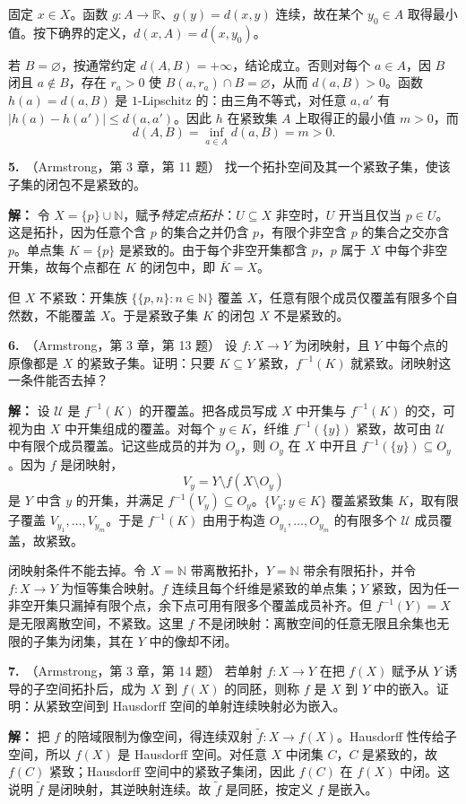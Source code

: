 \documentclass{article}
\newcommand{\R}{\mathbb R}
\newcommand{\problem}[2]{\par\medskip\noindent\textbf{#1.}\ （#2）\quad}
\begin{document}
固定 $x\in X$。函数 $g:A\to\R$、$g(y)=d(x,y)$ 连续，故在某个 $y_0\in A$ 取得最小值。按下确界的定义，$d(x,A)=d(x,y_0)$。

若 $B=\varnothing$，按通常约定 $d(A,B)=+\infty$，结论成立。否则对每个 $a\in A$，因 $B$ 闭且 $a\notin B$，存在 $r_a>0$ 使 $B(a,r_a)\cap B=\varnothing$，从而 $d(a,B)>0$。函数 $h(a)=d(a,B)$ 是 $1$-Lipschitz 的：由三角不等式，对任意 $a,a'$ 有 $|h(a)-h(a')|\le d(a,a')$。因此 $h$ 在紧致集 $A$ 上取得正的最小值 $m>0$，而
\[
d(A,B)=\inf_{a\in A}d(a,B)=m>0.
\]

\problem{5}{Armstrong，第 3 章，第 11 题}
找一个拓扑空间及其一个紧致子集，使该子集的闭包不是紧致的。
\par\noindent\textbf{解：}
令 $X=\{p\}\cup\mathbb N$，赋予\emph{特定点拓扑}：$U\subseteq X$ 非空时，$U$ 开当且仅当 $p\in U$。这是拓扑，因为任意个含 $p$ 的集合之并仍含 $p$，有限个非空含 $p$ 的集合之交亦含 $p$。单点集 $K=\{p\}$ 是紧致的。由于每个非空开集都含 $p$，$p$ 属于 $X$ 中每个非空开集，故每个点都在 $K$ 的闭包中，即 $\overline K=X$。

但 $X$ 不紧致：开集族 $\{\{p,n\}:n\in\mathbb N\}$ 覆盖 $X$，任意有限个成员仅覆盖有限多个自然数，不能覆盖 $X$。于是紧致子集 $K$ 的闭包 $X$ 不是紧致的。

\problem{6}{Armstrong，第 3 章，第 13 题}
设 $f:X\to Y$ 为闭映射，且 $Y$ 中每个点的原像都是 $X$ 的紧致子集。证明：只要 $K\subseteq Y$ 紧致，$f^{-1}(K)$ 就紧致。闭映射这一条件能否去掉？
\par\noindent\textbf{解：}
设 $\mathcal U$ 是 $f^{-1}(K)$ 的开覆盖。把各成员写成 $X$ 中开集与 $f^{-1}(K)$ 的交，可视为由 $X$ 中开集组成的覆盖。对每个 $y\in K$，纤维 $f^{-1}(\{y\})$ 紧致，故可由 $\mathcal U$ 中有限个成员覆盖。记这些成员的并为 $O_y$，则 $O_y$ 在 $X$ 中开且 $f^{-1}(\{y\})\subseteq O_y$。因为 $f$ 是闭映射，
\[
V_y=Y\setminus f(X\setminus O_y)
\]
是 $Y$ 中含 $y$ 的开集，并满足 $f^{-1}(V_y)\subseteq O_y$。$\{V_y:y\in K\}$ 覆盖紧致集 $K$，取有限子覆盖 $V_{y_1},\ldots,V_{y_m}$。于是 $f^{-1}(K)$ 由用于构造 $O_{y_1},\ldots,O_{y_m}$ 的有限多个 $\mathcal U$ 成员覆盖，故紧致。

闭映射条件不能去掉。令 $X=\mathbb N$ 带离散拓扑，$Y=\mathbb N$ 带余有限拓扑，并令 $f:X\to Y$ 为恒等集合映射。$f$ 连续且每个纤维是紧致的单点集；$Y$ 紧致，因为任一非空开集只漏掉有限个点，余下点可用有限多个覆盖成员补齐。但 $f^{-1}(Y)=X$ 是无限离散空间，不紧致。这里 $f$ 不是闭映射：离散空间的任意无限且余集也无限的子集为闭集，其在 $Y$ 中的像却不闭。

\problem{7}{Armstrong，第 3 章，第 14 题}
若单射 $f:X\to Y$ 在把 $f(X)$ 赋予从 $Y$ 诱导的子空间拓扑后，成为 $X$ 到 $f(X)$ 的同胚，则称 $f$ 是 $X$ 到 $Y$ 中的嵌入。证明：从紧致空间到 Hausdorff 空间的单射连续映射必为嵌入。
\par\noindent\textbf{解：}
把 $f$ 的陪域限制为像空间，得连续双射 $\widetilde f:X\to f(X)$。Hausdorff 性传给子空间，所以 $f(X)$ 是 Hausdorff 空间。对任意 $X$ 中闭集 $C$，$C$ 是紧致的，故 $f(C)$ 紧致；Hausdorff 空间中的紧致子集闭，因此 $f(C)$ 在 $f(X)$ 中闭。这说明 $\widetilde f$ 是闭映射，其逆映射连续。故 $\widetilde f$ 是同胚，按定义 $f$ 是嵌入。
\end{document}
